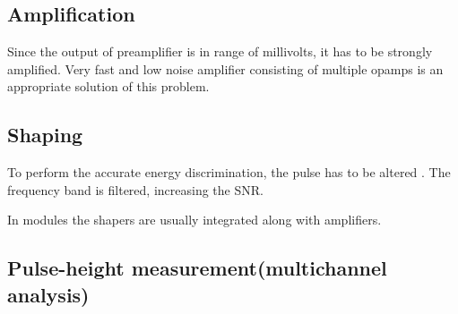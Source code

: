\subsection{Amplification}
Since the output of preamplifier is in range of millivolts, it has to be strongly amplified. Very fast and low noise amplifier consisting of multiple opamps is an appropriate solution of this problem.



\subsection{Shaping}

To perform the accurate energy discrimination, the pulse has to be altered . The frequency band is filtered, increasing the SNR. 

In modules the shapers are usually integrated along with amplifiers.

\subsection{Pulse-height measurement(multichannel analysis)}




